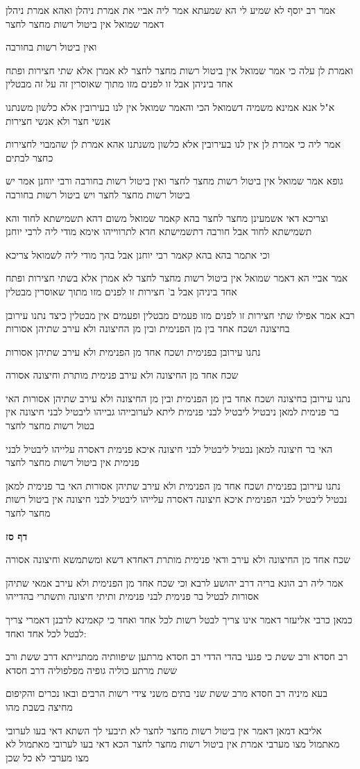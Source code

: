 \documentclass[12pt, openany]{book}
\newcommand{\sethebfont}{
\fontsize{10.5pt}{21.0pt} \selectfont
}
\newcommand{\textblock}[1]{
{\sethebfont #1\\}	
}
\newcommand{\sectname}{}
\newcommand{\newsection}[1]{
	\addcontentsline{toc}{section}{#1}
	\renewcommand{\sectname}{#1}	
	\vspace{-\baselineskip}
	\begin{center}
		\textbf{%
\fontsize{16pt}{16pt}\selectfont
			#1}
	\end{center}
	\vspace{-\baselineskip}
	\nopagebreak
}
\begin{document}
\textblock{אמר רב יוסף לא שמיע לי הא שמעתא אמר ליה אביי את אמרת ניהלן ואהא אמרת ניהלן דאמר שמואל אין ביטול רשות מחצר לחצר}
\textblock{ואין ביטול רשות בחורבה}
\textblock{ואמרת לן עלה כי אמר שמואל אין ביטול רשות מחצר לחצר לא אמרן אלא שתי חצירות ופתח אחד ביניהן אבל זו לפנים מזו מתוך שאוסרין זה על זה מבטלין}
\textblock{א"ל אנא אמינא משמיה דשמואל הכי והאמר שמואל אין לנו בעירובין אלא כלשון משנתנו אנשי חצר ולא אנשי חצירות}
\textblock{אמר ליה כי אמרת לן אין לנו בעירובין אלא כלשון משנתנו אהא אמרת לן שהמבוי לחצירות כחצר לבתים}
\textblock{גופא אמר שמואל אין ביטול רשות מחצר לחצר ואין ביטול רשות בחורבה ורבי יוחנן אמר יש ביטול רשות מחצר לחצר ויש ביטול רשות בחורבה}
\textblock{וצריכא דאי אשמעינן מחצר לחצר בהא קאמר שמואל משום דהא תשמישתא לחוד והא תשמישתא לחוד אבל חורבה דתשמישתא חדא לתרווייהו אימא מודי ליה לרבי יוחנן}
\textblock{וכי אתמר בהא בהא קאמר רבי יוחנן אבל בהך מודי ליה לשמואל צריכא}
\textblock{אמר אביי הא דאמר שמואל אין ביטול רשות מחצר לחצר לא אמרן אלא בשתי חצירות ופתח אחד ביניהן אבל ב' חצירות זו לפנים מזו מתוך שאוסרין מבטלין}
\textblock{רבא אמר אפילו שתי חצירות זו לפנים מזו פעמים מבטלין ופעמים אין מבטלין כיצד נתנו עירובן בחיצונה ושכח אחד בין מן הפנימית ובין מן החיצונה ולא עירב שתיהן אסורות}
\textblock{נתנו עירובן בפנימית ושכח אחד מן הפנימית ולא עירב שתיהן אסורות}
\textblock{שכח אחד מן החיצונה ולא עירב פנימית מותרת וחיצונה אסורה}
\textblock{נתנו עירובן בחיצונה ושכח אחד בין מן הפנימית ובין מן החיצונה ולא עירב שתיהן אסורות האי בר פנימית למאן ניבטיל ליבטיל לבני פנימית ליתא לערובייהו גבייהו ליבטיל לבני חיצונה אין בטול רשות מחצר לחצר}
\textblock{האי בר חיצונה למאן נבטיל ליבטיל לבני חיצונה איכא פנימית דאסרה עלייהו ליבטיל לבני פנימית אין ביטול רשות מחצר לחצר}
\textblock{נתנו עירובן בפנימית ושכח אחד מן הפנימית ולא עירב שתיהן אסורות האי בר פנימית למאן נבטיל ליבטיל לבני הפנימית איכא חיצונה דאסרה עלייהו ליבטיל לבני חיצונה אין ביטול רשות מחצר לחצר}
\newsection{דף סז}
\textblock{שכח אחד מן החיצונה ולא עירב ודאי פנימית מותרת דאחדא דשא ומשתמשא וחיצונה אסורה}
\textblock{אמר ליה רב הונא בריה דרב יהושע לרבא וכי שכח אחד מן הפנימית ולא עירב אמאי שתיהן אסורות לבטיל בר פנימית לבני פנימית ותיתי חיצונה ותשתרי בהדייהו}
\textblock{כמאן כרבי אליעזר דאמר אינו צריך לבטל רשות לכל אחד ואחד כי קאמינא לרבנן דאמרי צריך לבטל לכל אחד ואחד:}
\textblock{רב חסדא ורב ששת כי פגעי בהדי הדדי רב חסדא מרתען שיפוותיה ממתנייתא דרב ששת ורב ששת מרתע כוליה גופיה מפלפוליה דרב חסדא}
\textblock{בעא מיניה רב חסדא מרב ששת שני בתים משני צידי רשות הרבים ובאו נכרים והקיפום מחיצה בשבת מהו}
\textblock{אליבא דמאן דאמר אין ביטול רשות מחצר לחצר לא תיבעי לך השתא דאי בעו לערובי מאתמול מצו מערבי אמרת אין ביטול רשות מחצר לחצר הכא דאי בעו לערובי מאתמול לא מצו מערבי לא כל שכן}
\end{document}

